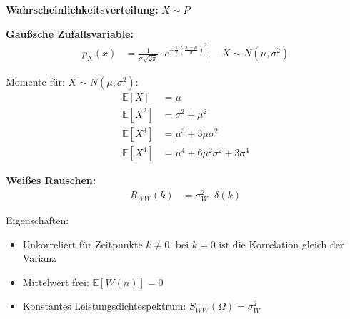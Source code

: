 \textbf{Wahrscheinlichkeitsverteilung:}
$X \sim P$

\textbf{Gaußsche Zufallsvariable:}
\begin{align}
p_X(x) &= \frac{1}{\sigma\sqrt{2\pi}} \cdot e^{-\frac{1}{2}\left(\frac{x-\mu}{\sigma}\right)^2}, \quad X \sim N(\mu,\sigma^2)
\end{align}

Momente für: $X \sim N(\mu,\sigma^2)$:
\begin{align}
\mathbb{E}[X] &= \mu\\
\mathbb{E}[X^2] &= \sigma^2 + \mu^2\\
\mathbb{E}[X^3] &= \mu^3 + 3\mu\sigma^2\\
\mathbb{E}[X^4] &= \mu^4 + 6\mu^2\sigma^2 + 3\sigma^4
\end{align}

\textbf{Weißes Rauschen:}
\begin{align}
R_{WW}(k) &= \sigma_W^2 \cdot \delta(k)
\end{align}

Eigenschaften:
\begin{itemize}
\item Unkorreliert für Zeitpunkte $k \neq 0$, bei $k = 0$ ist die Korrelation gleich der Varianz
\item Mittelwert frei: $\mathbb{E}[W(n)] = 0$
\item Konstantes Leistungsdichtespektrum: $S_{WW}(\Omega) = \sigma_W^2$

\end{itemize}
